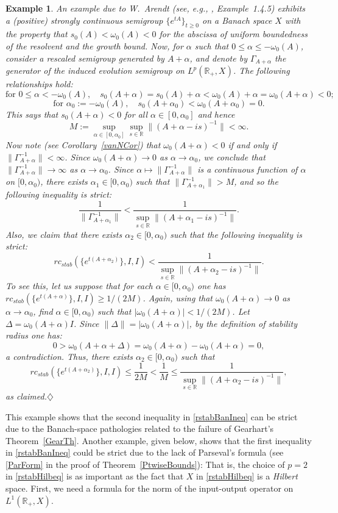 \documentclass[10pt,psamsfonts,leqno]{siamltex}
\newtheorem{example}[prop]{Example}
\newcommand{\bbR}{\mathbb{R}}
\newcommand{\LpRp}{{L^p(\bbR_+,X)}}
\newcommand{\rcstab}{rc_{stab}}
\begin{document}
\begin{example}\label{RstabIneqEx} {\em
An example due to W.~Arendt (see, e.g., \cite{vanNbook},
Example~1.4.5) exhibits a (positive) strongly continuous
semigroup $\{e^{tA}\}_{t\ge 0}$ on a Banach space $X$
with the property that
$s_0(A)<\omega_0(A)<0$ for the abscissa of uniform boundedness of the
resolvent and the growth bound.  Now, for
$\alpha$ such that
$0\le\alpha\le-\omega_0(A)$, consider a rescaled semigroup  generated by
$A+\alpha$, and denote by $\Gamma_{A+\alpha}$ the generator of the
induced
evolution semigroup on $\LpRp$. The following relationships hold:
\[ \mbox{for } 0\le\alpha<-\omega_0(A),\quad
s_0(A+\alpha)=s_0(A)+\alpha<\omega_0(A)+\alpha=\omega_0(A+\alpha)<0;
\]
\[\mbox{for } \alpha_0:=-\omega_0(A),\quad
s_0(A+\alpha_0)<\omega_0(A+\alpha_0)=0.
\]
This says that  $s_0(A+\alpha)<0$ for all $\alpha\in[0,\alpha_0]$
and hence
\[
M:=\sup_{\alpha\in[0,\alpha_0]}
\sup_{s\in\bbR}\|(A+\alpha-is)^{-1}\|<\infty.
\]
Now note (see Corollary~\ref{vanNCor})
 that $\omega_0(A+\alpha)<0$ if and only if
$\|\Gamma_{A+\alpha}^{-1}\|<\infty$. Since $\omega_0(A+\alpha)\to 0$
as $\alpha\to\alpha_0$, we conclude that
$\|\Gamma_{A+\alpha}^{-1}\|\to\infty$ as $\alpha\to\alpha_0$.
Since  $\alpha\mapsto\|\Gamma_{A+\alpha}^{-1}\|$
is a continuous function of $\alpha$ on $[0,\alpha_0)$,
there exists $\alpha_1 \in [0,\alpha_0)$ such that
$\|\Gamma_{A+\alpha_1}^{-1}\|>M$, and so the following
inequality is strict:
\[
\frac{1}{\|\Gamma_{A+\alpha_1}^{-1}\|}
< \frac{1}{\sup_{s\in\bbR}\|(A+\alpha_1-is)^{-1}\|}.
\]
Also, we claim that there exists $\alpha_2\in[0,\alpha_0)$ such that
the following inequality is strict:
\[ \rcstab(\{e^{t(A+\alpha_2)}\},I,I) <
\frac{1}{\sup_{s\in\bbR}\|(A+\alpha_2-is)^{-1}\|}.
\]
To see this, let us suppose that for each $\alpha\in[0,\alpha_0)$ one
has $\rcstab(\{e^{t(A+\alpha)}\},I,I)\ge 1/(2M)$. Again, using that
$\omega_0(A+\alpha)\to 0$
as $\alpha\to\alpha_0$, find $\alpha\in[0,\alpha_0)$ such that
$|\omega_0(A+\alpha)|<1/(2M)$. Let $\Delta=\omega_0(A+\alpha)I$.
Since $\|\Delta\|=|\omega_0(A+\alpha)|$, by the definition
of stability radius one has:
\[0>\omega_0(A+\alpha+\Delta)=\omega_0(A+\alpha)-\omega_0(A+\alpha)=0,\]
a contradiction. Thus, there exists $\alpha_2\in[0,\alpha_0)$ such that
\[\rcstab(\{e^{t(A+\alpha_2)}\},I,I)\le \frac{1}{2M}<
\frac{1}{M}\le
\frac{1}{\sup_{s\in\bbR}\|(A+\alpha_2-is)^{-1}\|},\]
as claimed.\hfill$\diamondsuit$
}
\end{example}

This example shows that the second inequality in \eqref{rstabBanIneq}
can be strict due to the Banach-space pathologies related to the failure
of Gearhart's Theorem~\ref{GearTh}. Another example, given below,
shows that the first inequality in \eqref{rstabBanIneq} could be
strict due to the lack of Parseval's formula (see \eqref{ParForm}
in the proof of Theorem~\ref{PtwiseBounds}):
That is, the choice of $p=2$ in \eqref{rstabHilbeq} is as
important as the fact that $X$
in \eqref{rstabHilbeq} is a {\it Hilbert} space.
First, we need a formula for the norm of the input-output operator
on $L^1({\mathbb R}_+,X)$.
\end{document}

